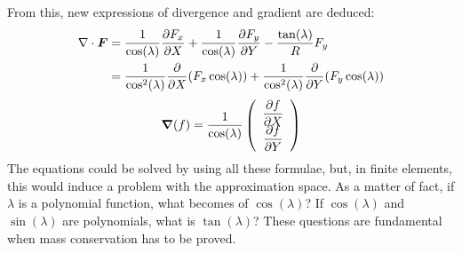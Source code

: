 From this, new expressions of divergence%
and gradient%
are deduced:%
\begin{align}
  \Div \vec{F}  &  =\dfrac{1}{\cos(\lambda)}\dfrac{\partial F_{x}}{\partial
    X}+\dfrac{1}{\cos(\lambda)}\dfrac{\partial F_{y}}{\partial Y}-\dfrac{\tan
    (\lambda)}{R}F_{y}\nonumber\\
  &  =\dfrac{1}{\cos^{2}(\lambda)}\dfrac{\partial}{\partial X}(F_{x}\cos
  (\lambda))+\dfrac{1}{\cos^{2}(\lambda)}\dfrac{\partial}{\partial Y}(F_{y}%
  \cos(\lambda))
\end{align}
%
\begin{equation}
  \Grad(f)=\dfrac{1}{\cos(\lambda)}\left(
    \begin{array}
      [c]{c}%
      \dfrac{\partial f}{\partial X}\\
      \dfrac{\partial f}{\partial Y}%
    \end{array}
  \right)
\end{equation}
The equations could be solved by using all these formulae, but, in finite
elements, this would induce a problem with the approximation space. As a matter
of fact, if $\lambda$ is a polynomial function, what becomes of $\cos
(\lambda)$? If $\cos(\lambda)$ and $\sin(\lambda)$ are polynomials, what is
$\tan(\lambda)$? These questions are fundamental when mass conservation has to
be proved.

